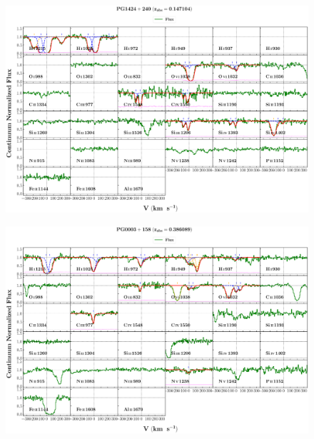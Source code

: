\documentclass[12pt]{report}
\begin{document}
\begin{landscape}

    \begin{figure}
    \centering
    \vspace{-20mm}
    \hspace*{-35mm}
    \includegraphics[width=1.25\linewidth]{sys_plots_full/PG1424+240_z=0.147104_sys_plot_full.png}
    \end{figure}
    
\end{landscape}


\begin{landscape}

    \begin{figure}
    \centering
    \vspace{-20mm}
    \hspace*{-35mm}
    \includegraphics[width=1.25\linewidth]{sys_plots_full/PG0003+158_z=0.386089_sys_plot_full.png}
    \end{figure}
    
\end{landscape}
\end{document}
